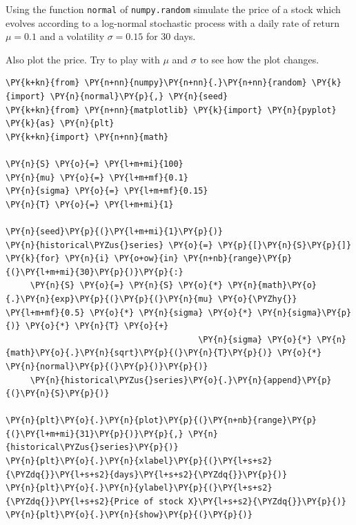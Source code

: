 \begin{Exercise}[title={(Stochastic Process Simulation)}]
Using the function \texttt{normal} of \texttt{numpy.random} simulate the price of a stock which evolves according to a log-normal stochastic process with a daily rate of return \(\mu=0.1\) and a volatility \(\sigma=0.15\) for 30 days.

Also plot the price. Try to play with \(\mu\) and \(\sigma\) to see how the plot changes.
\end{Exercise}
\vfill
\begin{Answer}
\begin{tcolorbox}[size=fbox, boxrule=1pt, colback=cellbackground, colframe=cellborder]
\begin{Verbatim}[commandchars=\\\{\}]
\PY{k+kn}{from} \PY{n+nn}{numpy}\PY{n+nn}{.}\PY{n+nn}{random} \PY{k}{import} \PY{n}{normal}\PY{p}{,} \PY{n}{seed}
\PY{k+kn}{from} \PY{n+nn}{matplotlib} \PY{k}{import} \PY{n}{pyplot} \PY{k}{as} \PY{n}{plt}
\PY{k+kn}{import} \PY{n+nn}{math}
 
\PY{n}{S} \PY{o}{=} \PY{l+m+mi}{100}
\PY{n}{mu} \PY{o}{=} \PY{l+m+mf}{0.1}
\PY{n}{sigma} \PY{o}{=} \PY{l+m+mf}{0.15}
\PY{n}{T} \PY{o}{=} \PY{l+m+mi}{1}
 
\PY{n}{seed}\PY{p}{(}\PY{l+m+mi}{1}\PY{p}{)}
\PY{n}{historical\PYZus{}series} \PY{o}{=} \PY{p}{[}\PY{n}{S}\PY{p}{]}
\PY{k}{for} \PY{n}{i} \PY{o+ow}{in} \PY{n+nb}{range}\PY{p}{(}\PY{l+m+mi}{30}\PY{p}{)}\PY{p}{:}
     \PY{n}{S} \PY{o}{=} \PY{n}{S} \PY{o}{*} \PY{n}{math}\PY{o}{.}\PY{n}{exp}\PY{p}{(}\PY{p}{(}\PY{n}{mu} \PY{o}{\PYZhy{}} \PY{l+m+mf}{0.5} \PY{o}{*} \PY{n}{sigma} \PY{o}{*} \PY{n}{sigma}\PY{p}{)} \PY{o}{*} \PY{n}{T} \PY{o}{+}
                                       \PY{n}{sigma} \PY{o}{*} \PY{n}{math}\PY{o}{.}\PY{n}{sqrt}\PY{p}{(}\PY{n}{T}\PY{p}{)} \PY{o}{*} \PY{n}{normal}\PY{p}{(}\PY{p}{)}\PY{p}{)}
     \PY{n}{historical\PYZus{}series}\PY{o}{.}\PY{n}{append}\PY{p}{(}\PY{n}{S}\PY{p}{)}
     
\PY{n}{plt}\PY{o}{.}\PY{n}{plot}\PY{p}{(}\PY{n+nb}{range}\PY{p}{(}\PY{l+m+mi}{31}\PY{p}{)}\PY{p}{,} \PY{n}{historical\PYZus{}series}\PY{p}{)}
\PY{n}{plt}\PY{o}{.}\PY{n}{xlabel}\PY{p}{(}\PY{l+s+s2}{\PYZdq{}}\PY{l+s+s2}{days}\PY{l+s+s2}{\PYZdq{}}\PY{p}{)}
\PY{n}{plt}\PY{o}{.}\PY{n}{ylabel}\PY{p}{(}\PY{l+s+s2}{\PYZdq{}}\PY{l+s+s2}{Price of stock X}\PY{l+s+s2}{\PYZdq{}}\PY{p}{)}
\PY{n}{plt}\PY{o}{.}\PY{n}{show}\PY{p}{(}\PY{p}{)}
\end{Verbatim}
\end{tcolorbox}


\end{Answer}
